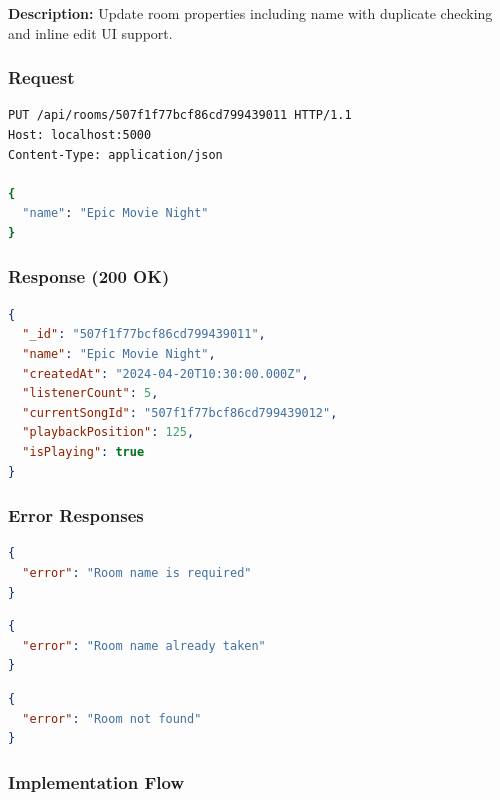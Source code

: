 \documentclass[11pt,a4paper]{article}
\begin{document}
\textbf{Description:} Update room properties including name with duplicate checking and inline edit UI support.

\subsubsection{Request}

\begin{lstlisting}[language=bash]
PUT /api/rooms/507f1f77bcf86cd799439011 HTTP/1.1
Host: localhost:5000
Content-Type: application/json

{
  "name": "Epic Movie Night"
}
\end{lstlisting}

\subsubsection{Response (200 OK)}

\begin{lstlisting}[language=json]
{
  "_id": "507f1f77bcf86cd799439011",
  "name": "Epic Movie Night",
  "createdAt": "2024-04-20T10:30:00.000Z",
  "listenerCount": 5,
  "currentSongId": "507f1f77bcf86cd799439012",
  "playbackPosition": 125,
  "isPlaying": true
}
\end{lstlisting}

\subsubsection{Error Responses}

\begin{lstlisting}[language=json, caption=400 Bad Request - Missing name]
{
  "error": "Room name is required"
}
\end{lstlisting}

\begin{lstlisting}[language=json, caption=409 Conflict - Duplicate name]
{
  "error": "Room name already taken"
}
\end{lstlisting}

\begin{lstlisting}[language=json, caption=404 Not Found]
{
  "error": "Room not found"
}
\end{lstlisting}

\subsubsection{Implementation Flow}
\end{document}
